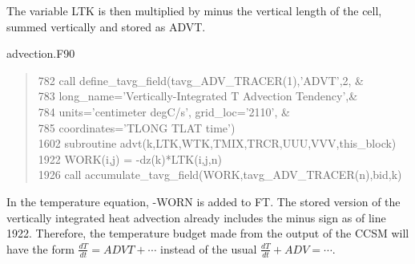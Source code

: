 The variable LTK is then multiplied by minus the vertical length of the cell, summed vertically and stored as ADVT. 
\begin{center} advection.F90 \end{center}
\begin{quotation}
\small
\linespread{0.5}\selectfont\noindent
\phantom{1}782 \hspace{1em} call define\_tavg\_field(tavg\_ADV\_TRACER(1),'ADVT',2,       \&\\
\phantom{1}783 \hspace{1em} long\_name='Vertically-Integrated T Advection Tendency',\&\\
\phantom{1}784 \hspace{1em} units='centimeter degC/s', grid\_loc='2110',      \&\\
\phantom{1}785 \hspace{1em} coordinates='TLONG TLAT time')\\
1602 \hspace{1em} subroutine advt(k,LTK,WTK,TMIX,TRCR,UUU,VVV,this\_block)\\
1922 \hspace{1em} WORK(i,j) = -dz(k)*LTK(i,j,n)\\
1926 \hspace{1em} call accumulate\_tavg\_field(WORK,tavg\_ADV\_TRACER(n),bid,k)
\end{quotation}
In the temperature equation, -WORN is added to FT. The stored version of the vertically integrated heat advection already includes the minus sign as of line 1922. Therefore, the temperature budget made from the output of the CCSM will have the form $\frac{dT}{dt} = ADVT + \cdots$ instead of the usual $\frac{dT}{dt} + ADV = \cdots$.

